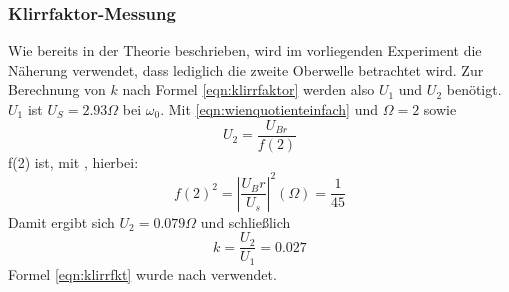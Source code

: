 \subsubsection{Klirrfaktor-Messung}
Wie bereits in der Theorie beschrieben, wird im vorliegenden Experiment die Näherung
verwendet, dass lediglich die zweite Oberwelle betrachtet wird.
Zur Berechnung von $k$ nach Formel \eqref{eqn:klirrfaktor} werden also $U_1$ und $U_2$ benötigt. $U_1$ ist $U_S=2.93 \Omega$ bei $\omega_0$. Mit \eqref{eqn:wienquotienteinfach} und $\Omega=2$ sowie
\begin{equation}
	\label{eqn:klirrfkt}
U_2=\frac{U_{Br}}{f(2)}
\end{equation}
f(2) ist, mit , hierbei:
\begin{equation}
f(2)^2=\left|\frac{U_Br}{U_s}\right|^2(\Omega)=\frac{1}{45}
\end{equation}
Damit ergibt sich $U_2=0.079 \Omega$ und schließlich
\begin{equation}
k=\frac{U_2}{U_1}=0.027
\end{equation}
Formel \eqref{eqn:klirrfkt} wurde nach \cite{Anleitung} verwendet.
